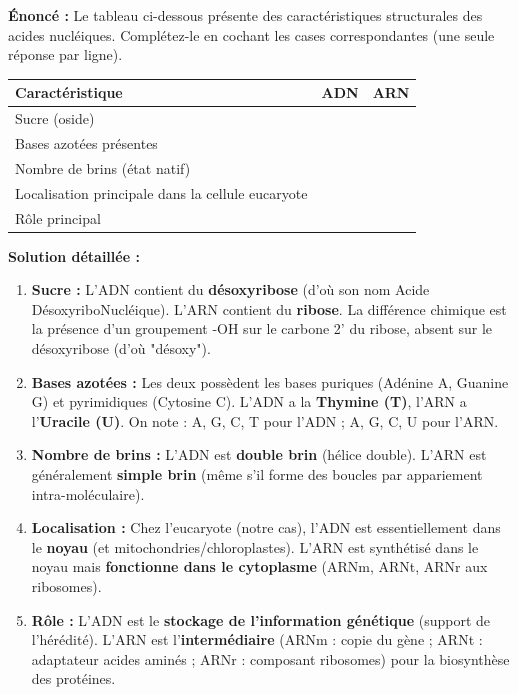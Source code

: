 \documentclass[11pt]{article}
\newcommand{\cle}[1]{{\popxbold\color{popdark}#1}}
\begin{document}
\begin{exoresolu}
    \textbf{Énoncé :} Le tableau ci-dessous présente des caractéristiques structurales des acides nucléiques. Complétez-le en cochant les cases correspondantes (une seule réponse par ligne).
    \begin{center}
        \begin{tabularx}{\linewidth}{|l|X|X|}\hline
            \rowcolor{popblueL} \textbf{Caractéristique} & \textbf{ADN} & \textbf{ARN} \\ \hline
            Sucre (oside) & & \\ \hline
            Bases azotées présentes & & \\ \hline
            Nombre de brins (état natif) & & \\ \hline
            Localisation principale dans la cellule eucaryote & & \\ \hline
            Rôle principal & & \\ \hline
        \end{tabularx}
    \end{center}
    \tcblower
    \textbf{Solution détaillée :}
    \begin{enumerate}
        \item \textbf{Sucre :} L'ADN contient du \textbf{désoxyribose} (d'où son nom Acide DésoxyriboNucléique). L'ARN contient du \textbf{ribose}. La différence chimique est la présence d'un groupement -OH sur le carbone 2' du ribose, absent sur le désoxyribose (d'où "désoxy").
        \item \textbf{Bases azotées :} Les deux possèdent les bases puriques (Adénine A, Guanine G) et pyrimidiques (Cytosine C). L'ADN a la \textbf{Thymine (T)}, l'ARN a l'\textbf{Uracile (U)}. On note : A, G, C, T pour l'ADN ; A, G, C, U pour l'ARN.
        \item \textbf{Nombre de brins :} L'ADN est \textbf{double brin} (hélice double). L'ARN est généralement \textbf{simple brin} (même s'il forme des boucles par appariement intra-moléculaire).
        \item \textbf{Localisation :} Chez l'eucaryote (notre cas), l'ADN est essentiellement dans le \textbf{noyau} (et mitochondries/chloroplastes). L'ARN est synthétisé dans le noyau mais \textbf{fonctionne dans le cytoplasme} (ARNm, ARNt, ARNr aux ribosomes).
        \item \textbf{Rôle :} L'ADN est le \textbf{stockage de l'information génétique} (support de l'hérédité). L'ARN est l'\textbf{intermédiaire} (ARNm : copie du gène ; ARNt : adaptateur acides aminés ; ARNr : composant ribosomes) pour la \cle{biosynthèse des protéines}.

\end{enumerate}
\end{exoresolu}
\end{document}
